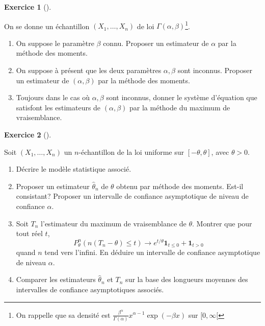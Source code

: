\documentclass[
  10,
  letterpaper,
  DIV=11,
  numbers=noendperiod]{scrreport}
\providecommand{\tightlist}{%
  \setlength{\itemsep}{0pt}\setlength{\parskip}{0pt}}\usepackage{longtable,booktabs,array}
\theoremstyle{plain}
\theoremstyle{definition}
\newtheorem{exercise}{Exercice}[chapter]
\theoremstyle{plain}
\theoremstyle{definition}
\theoremstyle{definition}
\theoremstyle{plain}
\theoremstyle{remark}
\begin{document}
\begin{exercise}[]\protect\hypertarget{exr-gammaemv}{}\label{exr-gammaemv}

On se donne un échantillon \((X_1,\dots,X_n)\) de loi
\(\Gamma(\alpha, \beta)\)\footnote{On rappelle que sa densité est
  \(\frac{\beta^\alpha}{\Gamma(\alpha)}x^{\alpha-1}\exp(-\beta x)\) sur
  \([0,\infty[\)}.

\begin{enumerate}
\def\labelenumi{\arabic{enumi}.}
\tightlist
\item
  On suppose le paramètre \(\beta\) connu. Proposer un estimateur de
  \(\alpha\) par la méthode des moments.
\item
  On suppose à présent que les deux paramètres \(\alpha, \beta\) sont
  inconnus. Proposer un estimateur de \((\alpha,\beta)\) par la méthode
  des moments.
\item
  Toujours dans le cas où \(\alpha, \beta\) sont inconnus, donner le
  système d'équation que satisfont les estimateurs de
  \((\alpha, \beta)\) par la méthode du maximum de vraisemblance.
\end{enumerate}

\end{exercise}

\begin{exercise}[]\protect\hypertarget{exr-unifemv}{}\label{exr-unifemv}

Soit \((X_1,\dots,X_n)\) un \(n\)-échantillon de la loi uniforme sur
\([-\theta,\theta]\), avec \(\theta>0\).

\begin{enumerate}
\def\labelenumi{\arabic{enumi}.}
\tightlist
\item
  Décrire le modèle statistique associé.
\item
  Proposer un estimateur \(\hat \theta_n\) de \(\theta\) obtenu par
  méthode des moments. Est-il consistant? Proposer un intervalle de
  confiance asymptotique de niveau de confiance \(\alpha\).

  \item

  Soit \(T_n\) l'estimateur du maximum de vraisemblance de \(\theta\).
  Montrer que pour tout réel \(t\),
  \[P_\theta^n\left(n(T_n-\theta)\leq t\right)\to e^{t/\theta}
  \mathbf{1}_{t\leq 0}+\mathbf{1}_{t> 0}\] quand \(n\) tend vers
  l'infini. En déduire un intervalle de confiance asymptotique de niveau
  \(\alpha\).
\item
  Comparer les estimateurs \(\hat \theta_n\) et \(T_n\) sur la base des
  longueurs moyennes des intervalles de confiance asymptotiques
  associés.
\end{enumerate}

\end{exercise}
\end{document}
